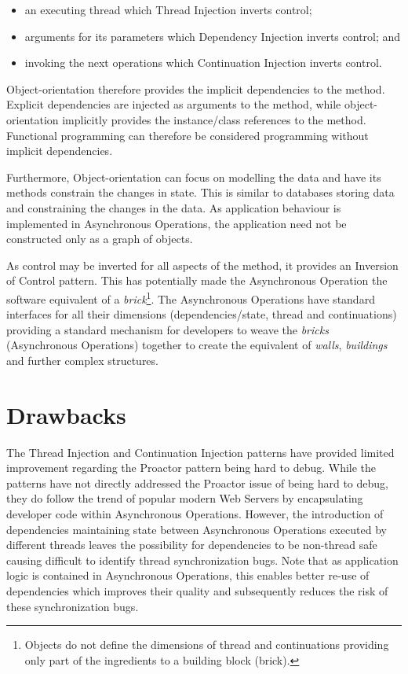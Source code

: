 \documentclass[prodmode]{style/acmlarge}
\begin{document}
\begin{itemize}
  \item an executing thread which Thread Injection inverts control;
  \item arguments for its parameters which Dependency Injection inverts control; and
  \item invoking the next operations which Continuation Injection inverts control.
\end{itemize}

Object-orientation therefore provides the implicit dependencies to the
method.  Explicit dependencies are injected as arguments to the method, while
object-orientation implicitly provides the instance/class references to the
method.  Functional programming can therefore be considered programming without
implicit dependencies.

Furthermore, Object-orientation can focus on modelling the data and have its
methods constrain the changes in state.  This is similar to databases storing
data and constraining the changes in the data.  As application behaviour is
implemented in Asynchronous Operations, the application need not be constructed
only as a graph of objects.

As control may be inverted for all aspects of the method, it provides an
Inversion of Control pattern.  This has potentially made the Asynchronous
Operation the software equivalent of a \textit{brick}\footnote{Objects do not
define the dimensions of thread and continuations providing only part of the
ingredients to a building block (brick).}.  The Asynchronous Operations have
standard interfaces for all their dimensions (dependencies/state, thread and
continuations) providing a standard mechanism for developers to weave the
\textit{bricks} (Asynchronous Operations) together to create the equivalent of
\textit{walls}, \textit{buildings} and further complex structures.


\section{Drawbacks}

The Thread Injection and Continuation Injection patterns have provided limited
improvement regarding the Proactor pattern being hard to debug.  While the
patterns have not directly addressed the Proactor issue of being hard to debug,
they do follow the trend of popular modern Web Servers by encapsulating
developer code within Asynchronous Operations.  However, the introduction of
dependencies maintaining state between Asynchronous Operations executed by
different threads leaves the possibility for dependencies to be non-thread safe
causing difficult to identify thread synchronization bugs.  Note that as
application logic is contained in Asynchronous Operations, this enables better
re-use of dependencies which improves their quality and subsequently reduces the
risk of these synchronization bugs.
\end{document}
